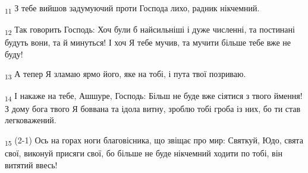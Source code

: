 \begin{tcolorbox}
\textsubscript{11} З тебе вийшов задумуючий проти Господа лихо, радник нікчемний.
\end{tcolorbox}
\begin{tcolorbox}
\textsubscript{12} Так говорить Господь: Хоч були б найсильніші і дуже численні, та постинані будуть вони, та й минуться! І хоч Я тебе мучив, та мучити більше тебе вже не буду!
\end{tcolorbox}
\begin{tcolorbox}
\textsubscript{13} А тепер Я зламаю ярмо його, яке на тобі, і пута твої позриваю.
\end{tcolorbox}
\begin{tcolorbox}
\textsubscript{14} І накаже на тебе, Ашшуре, Господь: Більш не буде вже сіятися з твого ймення! З дому бога твого Я боввана та ідола витну, зроблю тобі гроба із них, бо ти став легковажений.
\end{tcolorbox}
\begin{tcolorbox}
\textsubscript{15} (2-1) Ось на горах ноги благовісника, що звіщає про мир: Святкуй, Юдо, свята свої, виконуй присяги свої, бо більше не буде нікчемний ходити по тобі, він витятий ввесь!
\end{tcolorbox}

